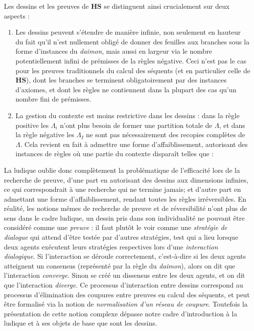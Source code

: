 \documentclass[11pt]{report}
\newcommand{\seq}{\vdash}
\newcommand{\irule}[1]{\footnotesize$#1$}
\begin{document}
Les dessins et les preuves de $\mathbf{HS}$ se distinguent ainsi crucialement sur deux aspects :
\begin{enumerate}
	\item Les dessins peuvent s'étendre de manière infinie, non seulement en hauteur du fait qu'il n'est nullement obligé de donner des feuilles aux branches sous la forme d'instances du \textit{daimon}, mais aussi en largeur via le nombre potentiellement infini de prémisses de la règles négative. Ceci n'est pas le cas pour les preuves traditionnels du calcul des séquents (et en particulier celle de $\mathbf{HS}$), dont les branches se terminent obligatoirement par des instances d'axiomes, et dont les règles ne contiennent dans la plupart des cas qu'un nombre fini de prémisses.
	\item La gestion du contexte est moins restrictive dans les dessins : dans la règle positive les $\Lambda_i$ n'ont plus besoin de former une partition totale de $\Lambda$, et dans la règle négative les $\Lambda_I$ ne sont pas nécessairement des recopies complètes de $\Lambda$. Cela revient en fait à admettre une forme d'affaiblissement, autorisant des instances de règles où une partie du contexte disparaît telles que :\\
	\begin{longtabu}{>{$}c<{$}>{$}c<{$}}
		\prftree[r]{\irule{\xi,\{1,2\}}}
		{\xi \ast 1 \seq \alpha}
		{\xi \ast 2 \seq \beta}
		{\seq \xi,\alpha,\beta,\gamma} &
		\prftree[r]{\irule{\xi,\{\{1,2\},\{1,3\}\}}}
		{\seq \xi \ast \{1,2\},\alpha,\beta}
		{\seq \xi \ast \{1,3\},\alpha}
		{\xi \seq \alpha,\beta,\gamma}
	\end{longtabu}
\end{enumerate}

La ludique oublie donc complètement la problématique de l'efficacité lors de la recherche de preuve, d'une part en autorisant des dessins aux dimensions infinies, ce qui correspondrait à une recherche qui ne termine jamais; et d'autre part en admettant une forme d'affaiblissement, rendant toutes les règles irréversibles. En réalité, les notions mêmes de recherche de preuve et de réversibilité n'ont plus de sens dans le cadre ludique, un dessin pris dans son individualité ne pouvant être considéré comme une \emph{preuve} : il faut plutôt le voir comme une \emph{stratégie de dialogue} qui attend d'être testée par d'autres stratégies, test qui a lieu lorsque deux agents exécutent leurs stratégies respectives lors d'une \emph{interaction dialogique}. Si l'interaction se déroule correctement, c'est-à-dire si les deux agents atteignent un consensus (représenté par la règle du \textit{daimon}), alors on dit que l'interaction \emph{converge}. Sinon se créé un dissensus entre les deux agents, et on dit que l'interaction \emph{diverge}. Ce processus d'interaction entre dessins correspond au processus d'élimination des coupures entre preuves en calcul des séquents, et peut être formalisé via la notion de \emph{normalisation d'un réseau de coupure}. Toutefois la présentation de cette notion complexe dépasse notre cadre d'introduction à la ludique et à ses objets de base que sont les dessins.
\end{document}
